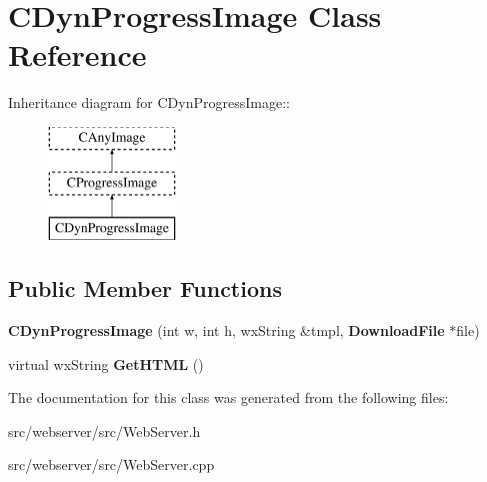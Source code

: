 \section{CDynProgressImage Class Reference}
\label{classCDynProgressImage}
Inheritance diagram for CDynProgressImage::\begin{figure}[H]
\begin{center}
\leavevmode
\includegraphics[height=3cm]{classCDynProgressImage}
\end{center}
\end{figure}
\subsection*{Public Member Functions}
\begin{DoxyCompactItemize}
\item 
{\bfseries CDynProgressImage} (int w, int h, wxString \&tmpl, {\bf DownloadFile} $\ast$file)\label{classCDynProgressImage_a672d9eb64a18ae73b0df3dcf4e80bd00}

\item 
virtual wxString {\bfseries GetHTML} ()\label{classCDynProgressImage_a64166e26956de20a188d7f84fbbcca4d}

\end{DoxyCompactItemize}


The documentation for this class was generated from the following files:\begin{DoxyCompactItemize}
\item 
src/webserver/src/WebServer.h\item 
src/webserver/src/WebServer.cpp\end{DoxyCompactItemize}
